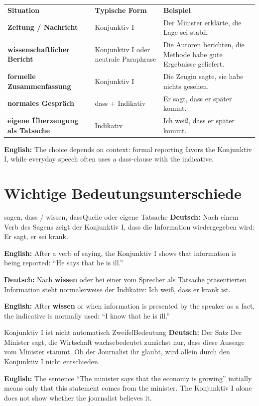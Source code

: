\documentclass[a4paper,11pt]{article}
\newcommand{\GermanText}[1]{\textbf{Deutsch: }#1\par}
\newcommand{\EnglishText}[1]{{\small\color{SoftGray}\textbf{English: }#1\par}}
\begin{document}
        \begin{longtable}{>{\bfseries}p{4.0cm}|p{5.0cm}|p{4.8cm}}
            \rowcolor{HeaderBlueDark}
            \color{white}\textbf{Situation} &
            \color{white}\textbf{Typische Form} &
            \color{white}\textbf{Beispiel} \\
            Zeitung / Nachricht & Konjunktiv I & Der Minister erklärte, die Lage sei stabil. \\
            wissenschaftlicher Bericht & Konjunktiv I oder neutrale Paraphrase & Die Autoren berichten, die Methode habe gute Ergebnisse geliefert. \\
            formelle Zusammenfassung & Konjunktiv I & Die Zeugin sagte, sie habe nichts gesehen. \\
            normales Gespräch & dass + Indikativ & Er sagt, dass er später kommt. \\
            eigene Überzeugung als Tatsache & Indikativ & Ich weiß, dass er später kommt. \\
        \end{longtable}

        \EnglishText{The choice depends on context: formal reporting favors the Konjunktiv I, while everyday speech often uses a dass-clause with the indicative.}


    \section{Wichtige Bedeutungsunterschiede}

        \begin{grammarentry}{sagen, dass / wissen, dass}{Quelle oder eigene Tatsache}
            \GermanText{Nach einem Verb des Sagens zeigt der Konjunktiv I, dass die Information wiedergegeben wird: \glqq Er sagt, er sei krank.\grqq}
            \EnglishText{After a verb of saying, the Konjunktiv I shows that information is being reported: ``He says that he is ill.''}

            \GermanText{Nach \textbf{wissen} oder bei einer vom Sprecher als Tatsache präsentierten Information steht normalerweise der Indikativ: \glqq Ich weiß, dass er krank ist.\grqq}
            \EnglishText{After \textbf{wissen} or when information is presented by the speaker as a fact, the indicative is normally used: ``I know that he is ill.''}
        \end{grammarentry}

        \begin{grammarentry}{Konjunktiv I ist nicht automatisch Zweifel}{Bedeutung}
            \GermanText{Der Satz \glqq Der Minister sagt, die Wirtschaft wachse\grqq bedeutet zunächst nur, dass diese Aussage vom Minister stammt. Ob der Journalist ihr glaubt, wird allein durch den Konjunktiv I nicht entschieden.}
            \EnglishText{The sentence ``The minister says that the economy is growing'' initially means only that this statement comes from the minister. The Konjunktiv I alone does not show whether the journalist believes it.}
        \end{grammarentry}
\end{document}
